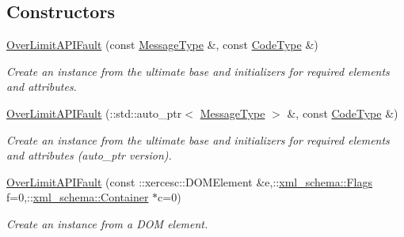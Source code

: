 \subsection*{Constructors}
\begin{DoxyCompactItemize}
\item 
\hypertarget{classopenstack_1_1xml_1_1OverLimitAPIFault_aa20fe9b006af8687890423cc31fa3a0c}{
\hyperlink{classopenstack_1_1xml_1_1OverLimitAPIFault_aa20fe9b006af8687890423cc31fa3a0c}{OverLimitAPIFault} (const \hyperlink{classopenstack_1_1xml_1_1CloudServersAPIFault_aff7b9d2067747fa033a0ea4408011af6}{MessageType} \&, const \hyperlink{classopenstack_1_1xml_1_1CloudServersAPIFault_aa9f350c9dba08ae375b2a61568551550}{CodeType} \&)}
\label{classopenstack_1_1xml_1_1OverLimitAPIFault_aa20fe9b006af8687890423cc31fa3a0c}

\begin{DoxyCompactList}\small\item\em Create an instance from the ultimate base and initializers for required elements and attributes. \item\end{DoxyCompactList}\item 
\hyperlink{classopenstack_1_1xml_1_1OverLimitAPIFault_a72e01a24006279c95274f32c4723fb19}{OverLimitAPIFault} (::std::auto\_\-ptr$<$ \hyperlink{classopenstack_1_1xml_1_1CloudServersAPIFault_aff7b9d2067747fa033a0ea4408011af6}{MessageType} $>$ \&, const \hyperlink{classopenstack_1_1xml_1_1CloudServersAPIFault_aa9f350c9dba08ae375b2a61568551550}{CodeType} \&)
\begin{DoxyCompactList}\small\item\em Create an instance from the ultimate base and initializers for required elements and attributes (auto\_\-ptr version). \item\end{DoxyCompactList}\item 
\hyperlink{classopenstack_1_1xml_1_1OverLimitAPIFault_ac11fa74c729897eb204f13ed116cb077}{OverLimitAPIFault} (const ::xercesc::DOMElement \&e,::\hyperlink{namespacexml__schema_affb4c227cbd9aa7453dd1dc5a1401943}{xml\_\-schema::Flags} f=0,::\hyperlink{namespacexml__schema_a333dea2213742aea47a37532dec4ec27}{xml\_\-schema::Container} $\ast$c=0)
\begin{DoxyCompactList}\small\item\em Create an instance from a DOM element. \item\end{DoxyCompactList}\item 

\end{DoxyCompactItemize}
